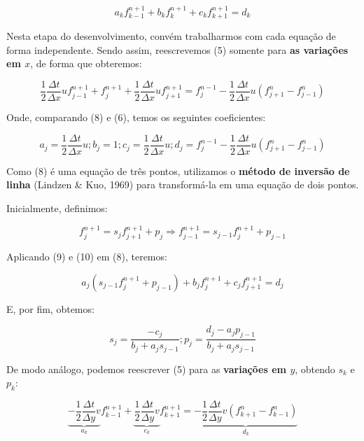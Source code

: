 \documentclass[11pt]{article}
\begin{document}
\begin{equation}
    a_kf^{n+1}_{k-1} + b_kf^{n+1}_{k} + c_kf^{n+1}_{k+1} = d_k
\end{equation}

Nesta etapa do desenvolvimento, convém trabalharmos com cada equação de
forma independente. Sendo assim, reescrevemos (5) somente para
\textbf{as variações em \(x\)}, de forma que obteremos:

\begin{equation}
    \frac{1}{2}\frac{\Delta{t}}{\Delta{x}}uf^{n+1}_{j-1} + f^{n+1}_{j} + \frac{1}{2}\frac{\Delta{t}}{\Delta{x}}uf^{n+1}_{j+1}  = f^{n-1}_{j} - \frac{1}{2}\frac{\Delta{t}}{\Delta{x}}u(f^{n}_{j+1} - f^{n}_{j-1})
\end{equation}

Onde, comparando (8) e (6), temos os seguintes coeficientes:

\begin{equation}
a_j = \frac{1}{2}\frac{\Delta{t}}{\Delta{x}}u; b_j = 1; c_j = \frac{1}{2}\frac{\Delta{t}}{\Delta{x}}u; d_j = f^{n-1}_{j} - \frac{1}{2}\frac{\Delta{t}}{\Delta{x}}u(f^{n}_{j+1} - f^{n}_{j-1})
\end{equation}

Como (8) é uma equação de três pontos, utilizamos o \textbf{método de
inversão de linha} (Lindzen \& Kuo, 1969) para transformá-la em uma
equação de dois pontos.

Inicialmente, definimos:

\begin{equation}
    f^{n+1}_{j} = s_{j}f^{n+1}_{j+1} + p_j \Rightarrow f^{n+1}_{j-1} = s_{j-1}f^{n+1}_{j} + p_{j-1}
\end{equation}

Aplicando (9) e (10) em (8), teremos:

\begin{equation}
    a_j(s_{j-1}f^{n+1}_{j} + p_{j-1}) + b_jf^{n+1}_{j} + c_jf^{n+1}_{j+1} = d_j
\end{equation}

E, por fim, obtemos:

\begin{equation}
    s_j = \frac{-c_j}{b_j + a_js_{j-1}}; p_j = \frac{d_j - a_jp_{j-1}}{b_j + a_js_{j-1}}
\end{equation}

De modo análogo, podemos reescrever (5) para as \textbf{variações em
\(y\)}, obtendo \(s_k\) e \(p_k\):

\begin{equation}
    \underbrace{-\frac{1}{2}\frac{\Delta{t}}{\Delta{y}}v}_{a_k}f^{n+1}_{k-1} + 
    \underbrace{\frac{1}{2}\frac{\Delta{t}}{\Delta{y}}v}_{c_k}f^{n+1}_{k+1}  = 
    \underbrace{-\frac{1}{2}\frac{\Delta{t}}{\Delta{y}}v(f^{n}_{k+1} - f^{n}_{k-1})}_{d_k}
\end{equation}
\end{document}
